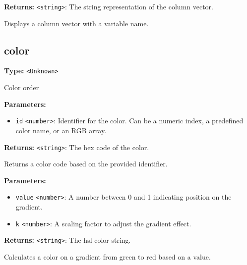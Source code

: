 \documentclass[12pt,a4paper]{article}
\begin{document}
\noindent \textbf{Returns:} \texttt{<string>}: The string representation of the column vector.

\noindent Displays a column vector with a variable name.


\subsection{color}
\vspace{5mm}
\noindent {}\vspace{4mm}


\noindent \textbf{Type:} \texttt{<Unknown>}

\noindent Color order

\vspace{5mm}
\noindent {}


\noindent \textbf{Parameters:}
\begin{itemize}
  \item \texttt{id} \texttt{<number>}: Identifier for the color. Can be a numeric index, a predefined color name, or an RGB array.
\end{itemize}

\noindent \textbf{Returns:} \texttt{<string>}: The hex code of the color.

\noindent Returns a color code based on the provided identifier.

\vspace{5mm}
\noindent {}


\noindent \textbf{Parameters:}
\begin{itemize}
  \item \texttt{value} \texttt{<number>}: A number between 0 and 1 indicating position on the gradient.
  \item \texttt{k} \texttt{<number>}: A scaling factor to adjust the gradient effect.
\end{itemize}

\noindent \textbf{Returns:} \texttt{<string>}: The hsl color string.

\noindent Calculates a color on a gradient from green to red based on a value.
\end{document}
